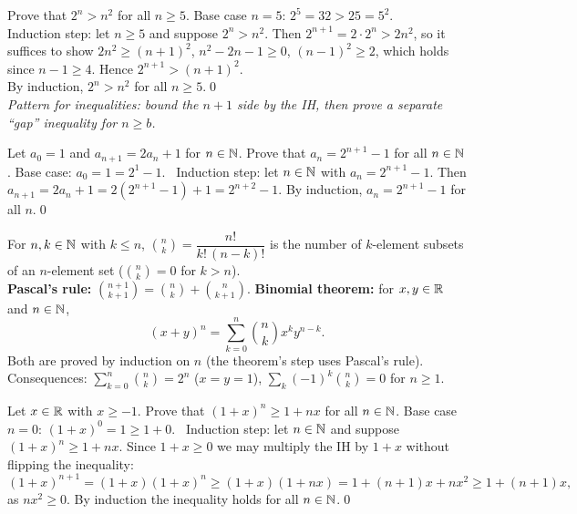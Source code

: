 \begin{hexample}
Prove that $2^n>n^2$ for all $n\ge5$.
\solution
Base case $n=5$: $2^5=32>25=5^2$.\\
Induction step: let $n\ge5$ and suppose $2^n>n^2$. Then $2^{n+1}=2\cdot2^n>2n^2$, so it suffices to show $2n^2\ge(n+1)^2$, \ie $n^2-2n-1\ge0$, \ie $(n-1)^2\ge2$, which holds since $n-1\ge4$. Hence $2^{n+1}>(n+1)^2$.\\
By induction, $2^n>n^2$ for all $n\ge5$.\qed\\
\emph{Pattern for inequalities: bound the $n+1$ side by the IH, then prove a separate ``gap'' inequality for $n\ge b$.}
\end{hexample}

\begin{hexample}
Let $a_0=1$ and $a_{n+1}=2a_n+1$ for $n\in\mathbb{N}$. Prove that $a_n=2^{n+1}-1$ for all $n\in\mathbb{N}$.
\solution
Base case: $a_0=1=2^1-1$. \ Induction step: let $n\in\mathbb{N}$ with $a_n=2^{n+1}-1$. Then $a_{n+1}=2a_n+1=2(2^{n+1}-1)+1=2^{n+2}-1$. By induction, $a_n=2^{n+1}-1$ for all $n$.\qed
\end{hexample}

\begin{key}
For $n,k\in\mathbb{N}$ with $k\le n$, $\binom nk=\dfrac{n!}{k!\,(n-k)!}$ is the number of $k$-element subsets of an $n$-element set ($\binom nk=0$ for $k>n$).\\
\textbf{Pascal's rule:} $\binom{n+1}{k+1}=\binom nk+\binom n{k+1}$. \quad \textbf{Binomial theorem:} for $x,y\in\mathbb{R}$ and $n\in\mathbb{N}$,
\[
(x+y)^n=\sum_{k=0}^n\binom nk x^k y^{n-k}.
\]
Both are proved by induction on $n$ (the theorem's step uses Pascal's rule). Consequences: $\sum_{k=0}^n\binom nk=2^n$ ($x=y=1$), $\sum_{k}(-1)^k\binom nk=0$ for $n\ge1$.
\end{key}

\begin{hexample}
Let $x\in\mathbb{R}$ with $x\ge-1$. Prove that $(1+x)^n\ge1+nx$ for all $n\in\mathbb{N}$.
\solution
Base case $n=0$: $(1+x)^0=1\ge1+0$. \ Induction step: let $n\in\mathbb{N}$ and suppose $(1+x)^n\ge1+nx$. Since $1+x\ge0$ we may multiply the IH by $1+x$ without flipping the inequality:
\[
(1+x)^{n+1}=(1+x)(1+x)^n\ge(1+x)(1+nx)=1+(n+1)x+nx^2\ge1+(n+1)x,
\]
as $nx^2\ge0$. By induction the inequality holds for all $n\in\mathbb{N}$.\qed
\end{hexample}

